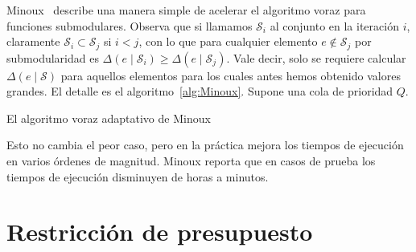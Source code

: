   Minoux~%
    \cite{minoux78:_accel_greed_algor_maxim_submod_set_funct}
  describe una manera simple de acelerar el algoritmo voraz
  para funciones submodulares.
  Observa que si llamamos \(\mathscr{S}_i\) al conjunto en la iteración \(i\),
  claramente \(\mathscr{S}_i \subset \mathscr{S}_j\) si \(i < j\),
  con lo que para cualquier elemento \(e \notin \mathscr{S}_j\)
  por submodularidad
  es \(\Delta(e \mid \mathscr{S}_i) \ge \Delta(e \mid \mathscr{S}_j)\).
  Vale decir,
  solo se requiere calcular \(\Delta(e \mid \mathscr{S})\)
  para aquellos elementos para los cuales antes hemos obtenido valores grandes.
  El detalle es el algoritmo~\ref{alg:Minoux}.
  Supone una cola de prioridad \(Q\).
  \begin{algorithm}[htbp]
     \DontPrintSemicolon\Indp

    \caption{El algoritmo voraz adaptativo de Minoux}
    \label{alg:Minoux}
  \end{algorithm}
  Esto no cambia el peor caso,
  pero en la práctica mejora los tiempos de ejecución
  en varios órdenes de magnitud.
  Minoux reporta que en casos de prueba los tiempos de ejecución
  disminuyen de horas a minutos.

\section{Restricción de presupuesto}
\label{sec:submodular-knapsack}

